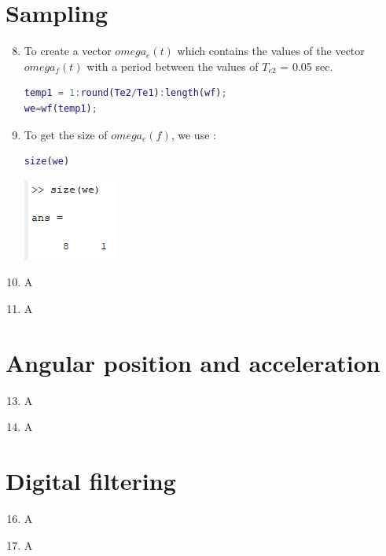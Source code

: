 \documentclass[a4paper,12pt]{article}
\begin{document}
\newpage
\section{Sampling}

\begin{enumerate}[label={\color{blue}\arabic*)}]
    \setcounter{enumi}{7}

    \item 
    To create a vector \(omega_e(t)\) which contains the values of the vector \(omega_f(t)\) with a period between the values of \(T_{e2}\) = 0.05 sec.
    \begin{lstlisting}[style=Matlab-editor,language=Matlab, basicstyle=\small\ttfamily]
temp1 = 1:round(Te2/Te1):length(wf);
we=wf(temp1);
        \end{lstlisting}
    
    \item 
    To get the size of \(omega_e(f)\), we use :
    \begin{lstlisting}[style=Matlab-editor,language=Matlab, basicstyle=\small\ttfamily]
size(we)
        \end{lstlisting}
    \begin{flushleft}
            \includegraphics[width=0.25\linewidth]{Images/size_we.png}
            \label{Figure6}
        \end{flushleft}

    \item 
    A

    \item 
    A

\end{enumerate}

\newpage
\section{Angular position and acceleration}

\begin{enumerate}[label={\color{blue}\arabic*)}]
    \setcounter{enumi}{12}

    \item 
    A
    
    \item 
    A

\end{enumerate}

\newpage
\section{Digital filtering}

\begin{enumerate}[label={\color{blue}\arabic*)}]
    \setcounter{enumi}{15}

    \item 
    A
    
    \item 
    A

\end{enumerate}
\end{document}
